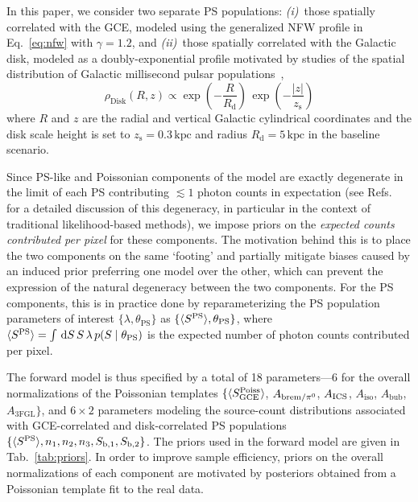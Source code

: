 \documentclass[prd,aps,10pt,nofootinbib,twocolumn,superscriptaddress,preprintnumbers,balancelastpage,longbibliography]{revtex4-1}
\begin{document}
In this paper, we consider two separate PS populations: \emph{(i)}~those spatially correlated with the GCE, modeled using the generalized NFW profile in Eq.~\eqref{eq:nfw} with $\gamma = 1.2$, and \emph{(ii)}~those spatially correlated with the Galactic disk, modeled as a doubly-exponential profile motivated by studies of the spatial distribution of Galactic millisecond pulsar populations~\cite{Lorimer:2006qs, Bartels:2018xom},
\begin{equation}
\label{eq:disk_spatial}
\rho_\mathrm{Disk}(R, z) \propto \exp \left(-\frac{R}{R_\mathrm{d}}\right) \, \exp\left(-\frac{|z|}{z_\mathrm{s}}\right)
\end{equation}
where $R$ and $z$ are the radial and vertical Galactic cylindrical coordinates and the disk scale height is set to $z_\mathrm{s} = 0.3\,\mathrm{kpc}$ and radius $R_\mathrm{d} = 5\,\mathrm{kpc}$ in the baseline scenario.  %

Since PS-like and Poissonian components of the model are exactly degenerate in the limit of each PS contributing $\lesssim 1$ photon counts in expectation (see Refs.~\cite{Chang:2019ars,Collin:2021ufc} for a detailed discussion of this degeneracy, in particular in the context of traditional likelihood-based methods), we impose priors on the \emph{expected counts contributed per pixel} for these components. The motivation behind this is to place the two components on the same `footing' and partially mitigate biases caused by an induced prior preferring one model over the other, which can prevent the expression of the natural degeneracy between the two components. For the PS components, this is in practice done by reparameterizing the PS population parameters of interest $\{\lambda, \theta_\mathrm{PS}\}$ as $\{\langle S^{\rm PS} \rangle, \theta_\mathrm{PS}\}$, where $\langle S^{\rm PS} \rangle = \int\,\mathrm{d} S\,S\,\lambda \, p(S\mid\theta_\mathrm{PS})$ is the expected number of photon counts contributed per pixel.

The forward model is thus specified by a total of 18 parameters---6 for the overall normalizations of the Poissonian templates $\{\langle S_{\rm GCE}^{\rm Poiss} \rangle$, $A_{{\rm brem}/\pi^0}$, $A_{\rm ICS}$, $A_\text{iso}$, $A_\text{bub}$, $A_\text{3FGL}\}$, and $6\times2$ parameters modeling the source-count distributions associated with GCE-correlated and disk-correlated PS populations $\{\langle S^{\rm PS} \rangle, n_1, n_2, n_3, S_{\mathrm b, 1}, S_{\mathrm b, 2}\}$. The priors used in the forward model are given in Tab.~\ref{tab:priors}. In order to improve sample efficiency, priors on the overall normalizations of each component are motivated by posteriors obtained from a Poissonian template fit to the real \Fermi data. 
\end{document}
